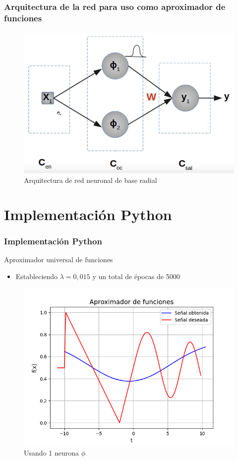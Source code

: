 \documentclass[
	11pt, %
]{beamer}
\begin{document}
\begin{frame}
  \frametitle{Arquitectura de la red para uso como aproximador de funciones}

  \begin{figure}
    \caption{Arquitectura de red neuronal de base radial}
    \includegraphics[width=0.6\linewidth]{last_.png}
  \end{figure}
  
  
\end{frame}

\section{Implementación Python}
\begin{frame}
  \frametitle{Implementación Python}

  Aproximador universal de funciones

  \begin{itemize}
  \item Estableciendo $\lambda = 0,015$ y un total de épocas de 5000
  \end{itemize}
  
  \begin{figure}
    \caption{Usando 1 neurona $\phi$}
    \includegraphics[width=0.6\linewidth]{1neurona.png}
  \end{figure}
  
  
\end{frame}
\end{document}
